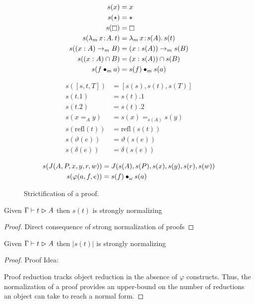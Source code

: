 \begin{figure}
    \centering
    \begin{minipage}{0.5\textwidth}
        \begin{align*}
            s(x) &= x \\
            s(\star) &= \star \\
            s(\kind) &= \kind \\
            s(\abs{\lambda_m}{x}{A}{t}) &= \abs{\lambda_m}{x}{s(A)}{s(t)} \\
            s((x:A) \to_m B) &= (x:s(A)) \to_m s(B) \\
            s((x:A) \cap B) &= (x:s(A)) \cap s(B) \\
            s(\app{f}{m}{a}) &= \app{s(f)}{m}{s(a)}
        \end{align*}%
    \end{minipage}%
    \begin{minipage}{0.5\textwidth}
        \begin{align*}
            s([s, t, T]) &= [s(s), s(t), s(T)] \\
            s(t.1) &= s(t).1 \\
            s(t.2) &= s(t).2 \\
            s(x =_A y) &= s(x) =_{s(A)} s(y) \\
            s(\text{refl}(t)) &= \text{refl}(s(t)) \\
            s(\vartheta(e)) &= \vartheta(s(e)) \\
            s(\delta(e)) &= \delta(s(e))
        \end{align*}%
    \end{minipage}%
    \begin{align*}
        s(J(A,P,x,y,r,w)) &= J(s(A),s(P),s(x),s(y),s(r),s(w)) \\
        s(\varphi(a,f,e)) &= s(f) \bullet_{\omega} s(a)
    \end{align*}
    \caption{Strictification of a proof.}
    \label{fig:strictification}
\end{figure}

\begin{lemma}
    Given $\Gamma \vdash t \vartriangleright A$ then $s(t)$ is strongly normalizing
\end{lemma}
\begin{proof}
    Direct consequence of strong normalization of proofs
\end{proof}

\begin{lemma}
    \label{lemma:strict-objects-normalize}
    Given $\Gamma \vdash t \vartriangleright A$ then $|s(t)|$ is strongly normalizing
\end{lemma}
\begin{proof}
    Proof Idea:

    Proof reduction tracks object reduction in the absence of $\varphi$ constructs.
    Thus, the normalization of a proof provides an upper-bound on the number of reductions an object can take to reach a normal form.
\end{proof}

